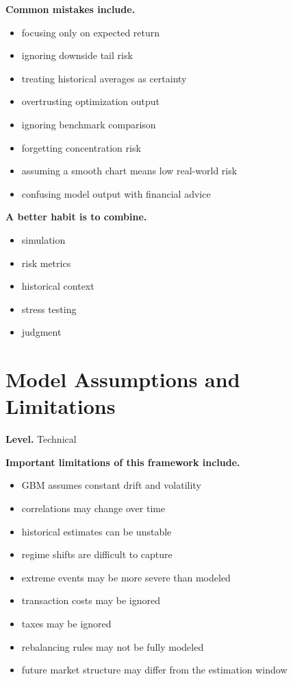 \documentclass[11pt]{report}
\begin{document}
\textbf{Common mistakes include.}

\begin{itemize}
\item focusing only on expected return
\item ignoring downside tail risk
\item treating historical averages as certainty
\item overtrusting optimization output
\item ignoring benchmark comparison
\item forgetting concentration risk
\item assuming a smooth chart means low real-world risk
\item confusing model output with financial advice
\end{itemize}

\textbf{A better habit is to combine.}

\begin{itemize}
\item simulation
\item risk metrics
\item historical context
\item stress testing
\item judgment
\end{itemize}

\section{Model Assumptions and Limitations}
\begin{callout}
\textbf{Level.} Technical
\end{callout}

\textbf{Important limitations of this framework include.}

\begin{itemize}
\item GBM assumes constant drift and volatility
\item correlations may change over time
\item historical estimates can be unstable
\item regime shifts are difficult to capture
\item extreme events may be more severe than modeled
\item transaction costs may be ignored
\item taxes may be ignored
\item rebalancing rules may not be fully modeled
\item future market structure may differ from the estimation window
\end{itemize}
\end{document}
